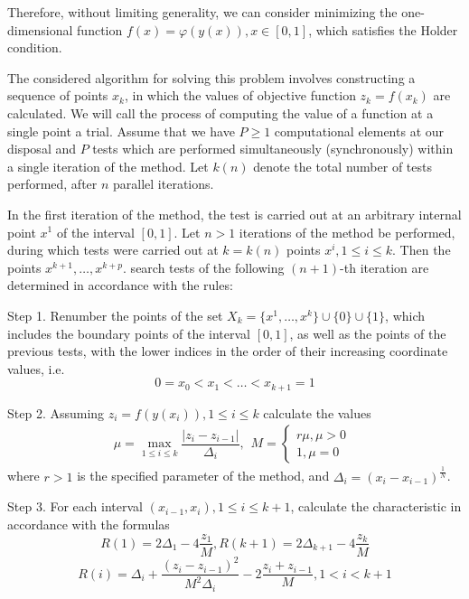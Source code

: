 \documentclass{svproc}
\begin{document}
Therefore, without limiting generality, we can consider minimizing the one-dimensional function \(f(x)=\varphi(y(x)), x\in[0,1]\), which satisfies the Holder condition.

The considered algorithm for solving this problem involves constructing a sequence of points \(x_k\), in which the values of objective function \(z_k = f(x_k)\) are calculated. We will call the process of computing the value of a function at a single point a trial. Assume that we have \(P\geqslant 1\) computational elements at our disposal and \(P\) tests which are performed simultaneously (synchronously) within a single iteration of the method. Let \(k(n)\) denote the total number of tests performed, after \(n\) parallel iterations.

In the first iteration of the method, the test is carried out at an arbitrary internal point \(x^1\) of the interval \([0,1]\). Let \(n>1\) iterations of the method be performed, during which tests were carried out at \(k = k(n)\) points \(x^i, 1\leqslant i\leqslant k\). Then the points  \(x^{k+1},\dotsc,x^{k+p}\). search tests of the following \((n+1)\)-th iteration are determined in accordance with the rules:

Step 1. Renumber the points of the set \(X_k=\{x^1,\dotsc,x^k\}\cup\{0\}\cup\{1\}\), which includes the boundary points of the interval \([0,1]\), as well as the points of the previous tests, with the lower indices in the order of their increasing coordinate values, i.e.
\begin{displaymath}
0=x_0<x_1<\dotsc<x_{k+1}=1
\end{displaymath}

Step 2. Assuming \(z_i=f(y(x_i)),1\leqslant i\leqslant k\) calculate the values
\begin{displaymath}
\label{step2}
\mu=\max_{1\leqslant i\leqslant k}\dfrac{|z_i-z_{i-1}|}{\Delta_i},
\begin{matrix}
    M = 
    \left\{
    \begin{matrix}
    r\mu,\mu>0 \\
    1,\mu=0
    \end{matrix} \right.
    \end{matrix}
\end{displaymath}
where \(r > 1\) is the specified parameter of the method, and \(\Delta_i=(x_i-x_{i-1})^\frac{1}{N}\). 

Step 3. For each interval \((x_{i-1},x_i),1\leqslant i\leqslant k+1\), calculate the characteristic in accordance with the formulas 
\begin{displaymath}
\label{step3_1}
R(1)=2\Delta_1-4\dfrac{z_1}{M},R(k+1)=2\Delta_{k+1}-4\dfrac{z_k}{M}
\end{displaymath}
\begin{displaymath}
\label{step3_2}
R(i)=\Delta_i+\dfrac{(z_i-z_{i-1})^2}{M^2\Delta_i}-2\dfrac{z_i+z_{i-1}}{M},1<i<k+1
\end{displaymath}
\end{document}
